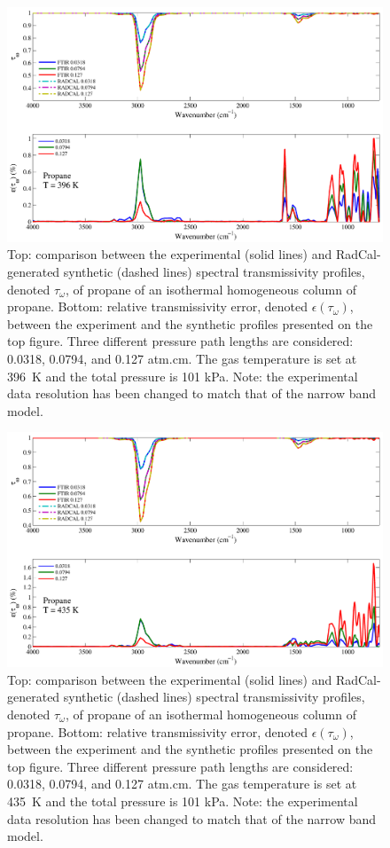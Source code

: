 \begin{figure}[p]
\includegraphics[width=\textwidth]{../Verification/Results_Test2/Propane_396.pdf}
\caption{Top: comparison between the experimental (solid lines) and RadCal-generated synthetic (dashed lines) spectral transmissivity profiles, denoted $\tau_{\omega}$, of propane of an isothermal homogeneous column of propane. Bottom: relative transmissivity error, denoted $\epsilon{(\tau_{\omega})}$, between the experiment and the synthetic profiles presented on the top figure. Three different pressure path lengths are considered: 0.0318, 0.0794, and 0.127 atm.cm. The gas temperature is set at 396~K and the total pressure is 101 kPa. Note: the experimental data resolution has been changed to match that of the narrow band model. \label{fig:propane_Verify_396K}}
\end{figure}
\newpage

\begin{figure}[p]
\includegraphics[width=\textwidth]{../Verification/Results_Test2/Propane_435.pdf}
\caption{Top: comparison between the experimental (solid lines) and RadCal-generated synthetic (dashed lines) spectral transmissivity profiles, denoted $\tau_{\omega}$, of propane of an isothermal homogeneous column of propane. Bottom: relative transmissivity error, denoted $\epsilon{(\tau_{\omega})}$, between the experiment and the synthetic profiles presented on the top figure. Three different pressure path lengths are considered: 0.0318, 0.0794, and 0.127 atm.cm. The gas temperature is set at 435~K and the total pressure is 101 kPa. Note: the experimental data resolution has been changed to match that of the narrow band model. \label{fig:propane_Verify_435K}}
\end{figure}

